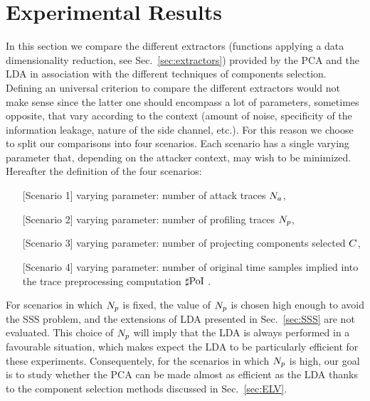 

\section{Experimental Results}\label{sec:experiments}

In this section we compare the different extractors (\ie functions applying a data dimensionality reduction, see Sec.~\ref{sec:extractors}) provided by the PCA and the LDA in association with the different techniques  of components selection. Defining an universal criterion to compare the different extractors would not make sense since the latter one should encompass a lot of parameters, sometimes opposite, that vary according to the context (amount of noise, specificity of the information leakage, nature of the side channel, etc.). For this reason we choose to split our comparisons into four scenarios. Each scenario has a single varying parameter that, depending on the attacker context, may wish to be minimized. Hereafter the definition of the four scenarios: 
\begin{itemize}
\item[][Scenario 1] varying parameter: number of attack traces $N_a$, 
\item[][Scenario 2] varying parameter: number of profiling traces $N_p$, 
\item[][Scenario 3] varying parameter: number of projecting components selected $C$,
\item[][Scenario 4] varying parameter: number of original time samples implied into the trace preprocessing computation $\sharp\mathrm{PoI}$ .
\end{itemize}
 
For scenarios in which $N_p$ is fixed, the value of $N_p$ is chosen high enough to avoid the SSS problem, and the extensions of LDA presented in Sec.~\ref{sec:SSS} are not evaluated.
 This choice of $N_p$ will imply that the LDA is always performed in a favourable situation, which makes expect the LDA to be particularly efficient for these experiments. Consequentely, for the scenarios in which $N_p$ is high, our goal is to study whether the PCA can be made almost as efficient as the LDA thanks to the component selection methods discussed in Sec.~\ref{sec:ELV}. 



